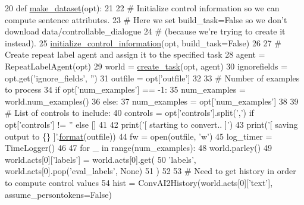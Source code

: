 \begin{DoxyCode}
20 \textcolor{keyword}{def }\hyperlink{namespaceprojects_1_1controllable__dialogue_1_1make__control__dataset_a8b209e575769f92c93ceb2c06e70fee1}{make\_dataset}(opt):
21 
22     \textcolor{comment}{# Initialize control information so we can compute sentence attributes.}
23     \textcolor{comment}{# Here we set build\_task=False so we don't download data/controllable\_dialogue}
24     \textcolor{comment}{# (because we're trying to create it instead).}
25     \hyperlink{namespaceprojects_1_1controllable__dialogue_1_1controllable__seq2seq_1_1controls_aafbe257df1791349439cc63c99de8b5e}{initialize\_control\_information}(opt, build\_task=\textcolor{keyword}{False})
26 
27     \textcolor{comment}{# Create repeat label agent and assign it to the specified task}
28     agent = RepeatLabelAgent(opt)
29     world = \hyperlink{namespaceparlai_1_1core_1_1worlds_a11923c10b545c7ecc1b08fe2242d9c2c}{create\_task}(opt, agent)
30     ignorefields = opt.get(\textcolor{stringliteral}{'ignore\_fields'}, \textcolor{stringliteral}{''})
31     outfile = opt[\textcolor{stringliteral}{'outfile'}]
32 
33     \textcolor{comment}{# Number of examples to process}
34     \textcolor{keywordflow}{if} opt[\textcolor{stringliteral}{'num\_examples'}] == -1:
35         num\_examples = world.num\_examples()
36     \textcolor{keywordflow}{else}:
37         num\_examples = opt[\textcolor{stringliteral}{'num\_examples'}]
38 
39     \textcolor{comment}{# List of controls to include:}
40     controls = opt[\textcolor{stringliteral}{'controls'}].split(\textcolor{stringliteral}{','}) \textcolor{keywordflow}{if} opt[\textcolor{stringliteral}{'controls'}] != \textcolor{stringliteral}{''} \textcolor{keywordflow}{else} []
41 
42     print(\textcolor{stringliteral}{'[ starting to convert.. ]'})
43     print(\textcolor{stringliteral}{'[ saving output to \{\} ]'}.\hyperlink{namespaceparlai_1_1chat__service_1_1services_1_1messenger_1_1shared__utils_a32e2e2022b824fbaf80c747160b52a76}{format}(outfile))
44     fw = open(outfile, \textcolor{stringliteral}{'w'})
45     log\_timer = TimeLogger()
46 
47     \textcolor{keywordflow}{for} \_ \textcolor{keywordflow}{in} range(num\_examples):
48         world.parley()
49         world.acts[0][\textcolor{stringliteral}{'labels'}] = world.acts[0].get(
50             \textcolor{stringliteral}{'labels'}, world.acts[0].pop(\textcolor{stringliteral}{'eval\_labels'}, \textcolor{keywordtype}{None})
51         )
52 
53         \textcolor{comment}{# Need to get history in order to compute control values}
54         hist = ConvAI2History(world.acts[0][\textcolor{stringliteral}{'text'}], assume\_persontokens=\textcolor{keyword}{False})

\end{DoxyCode}
